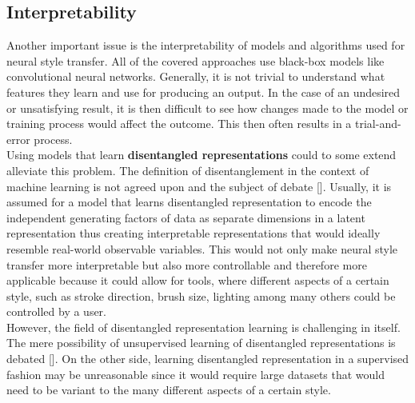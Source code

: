 \documentclass{seminar}
\begin{document}
	\subsection{Interpretability}
	Another important issue is the interpretability of models and algorithms used for neural style transfer. All of the covered approaches use black-box models like convolutional neural networks. Generally, it is not trivial to understand what features they learn and use for producing an output. In the case of an undesired or unsatisfying result, it is then difficult to see how changes made to the model or training process would affect the outcome. This then often results in a trial-and-error process.\\
	Using models that learn \textbf{disentangled representations} could to some extend alleviate this problem. The definition of disentanglement in the context of machine learning is not agreed upon and the subject of debate [\cite{higgins2018towards}]. Usually, it is assumed for a model that learns disentangled representation to encode the independent generating factors of data as separate dimensions in a latent representation thus creating interpretable representations that would ideally resemble real-world observable variables. This would not only make neural style transfer more interpretable but also more controllable and therefore more applicable because it could allow for tools, where different aspects of a certain style, such as stroke direction, brush size, lighting among many others could be controlled by a user.\\
	However, the field of disentangled representation learning is challenging in itself.
	The mere possibility of unsupervised learning of disentangled representations is debated [\cite{locatello2018challenging}]. On the other side, learning disentangled representation in a supervised fashion may be unreasonable since it would require large datasets that would need to be variant to the many different aspects of a certain style.
	
	
	
	
	
\end{document}
